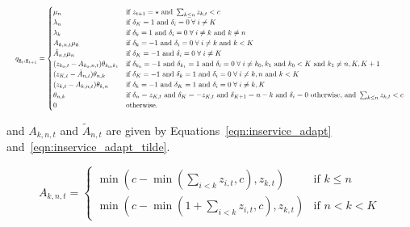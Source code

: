 \documentclass{article}
\begin{document}
\begin{equation}\label{eqn:transitions_sojourn}
\resizebox{\textwidth}{!}{%
$q_{\underline{\mathbf{z}}_t, \underline{\mathbf{z}}_{t+1}} = 
\begin{cases}
\mu_n & \text{if } z_{t+1} = \star \text{ and } \sum_{k \leq n} z_{k, t} < c \\
\lambda_n & \text{if } \delta_K = 1 \text{ and } \delta_i = 0 \; \forall \; i \neq K \\
\lambda_k & \text{if } \delta_k = 1 \text{ and } \delta_i = 0 \; \forall \; i \neq k \text{ and } k \neq n\\
A_{k,n,t} \mu_k & \text{if } \delta_k = -1 \text{ and } \delta_i = 0 \; \forall \; i \neq k \text{ and } k < K\\
\tilde{A}_{n,t} \mu_n & \text{if } \delta_K = -1 \text{ and } \delta_i = 0 \; \forall \; i \neq K\\
(z_{k_0,t} - A_{k_0,n,t}) \theta_{k_0,k_1} & \text{if } \delta_{k_0} = -1 \text{ and } \delta_{k_1} = 1 \text{ and } \delta_i = 0 \; \forall \; i \neq k_0, k_1 \text{ and } k_0 < K \text{ and } k_1 \neq n, K, K+1 \\
(z_{K,t} - \tilde{A}_{n,t}) \theta_{n,k} & \text{if } \delta_K = -1 \text{ and } \delta_{k} = 1 \text{ and } \delta_i = 0 \; \forall \; i \neq k, n \text{ and } k < K \\
(z_{k,t} - A_{k,n,t}) \theta_{k,n} & \text{if } \delta_k = -1 \text{ and } \delta_K = 1 \text{ and } \delta_i = 0 \; \forall \; i \neq k, K \\
\theta_{n, k} & \text{if } \delta_n = z_{K,t} \text{ and } \delta_K = -z_{K,t} \text{ and } \delta_{K+1} = n - k \text{ and } \delta_i = 0 \text{ otherwise, and } \sum_{k \leq n} z_{k, t} < c \\
0 & \text{otherwise.}
\end{cases}$%
}
\end{equation}

and $A_{k,n,t}$ and $\tilde{A}_{n, t}$ are given by
Equations~\ref{eqn:inservice_adapt} and~\ref{eqn:inservice_adapt_tilde}.

\begin{equation}\label{eqn:inservice_adapt}
A_{k,n,t} =
\begin{cases}
\min\left(c - \min\left(\sum_{i < k} z_{i,t}, c\right), z_{k,t}\right) & \text{if } k \leq n \\
\min\left(c - \min\left(1 + \sum_{i < k} z_{i,t}, c\right), z_{k,t}\right) & \text{if } n < k < K
\end{cases}
\end{equation}
\end{document}
